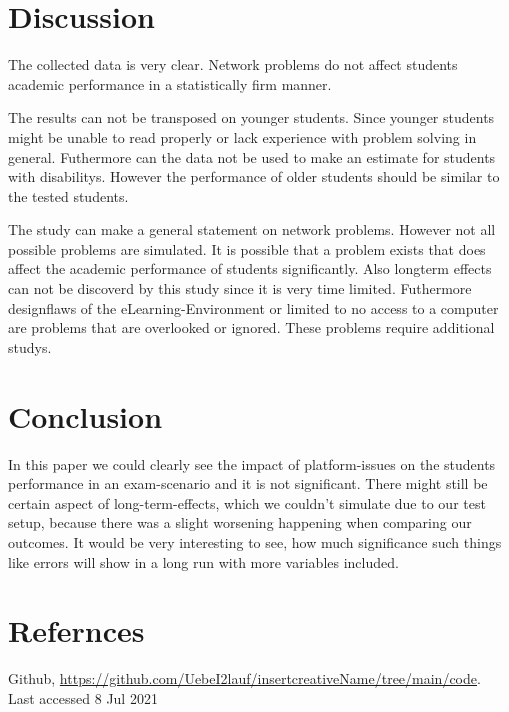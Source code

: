 \documentclass[runningheads]{llncs}
\begin{document}
\section{Discussion}
The collected data is very clear. Network problems do not affect students academic performance
in a statistically firm manner.

The results can not be transposed on younger students.
Since younger students might be unable to read properly or lack experience with problem solving
in general. Futhermore can the data not be used to make an estimate for students with disabilitys.
However the performance of older students should be similar to the tested students.

The study can make a general statement on network problems. However not all possible
problems are simulated. It is possible that a problem exists that does affect the academic performance of
students significantly. Also longterm effects can not be discoverd by this study since it is very time limited.
Futhermore designflaws of the eLearning-Environment or limited to no access to a computer are problems that
are overlooked or ignored. These problems require additional studys.
\section{Conclusion}
In this paper we could clearly see the impact of platform-issues on the students performance in an 
exam-scenario and it is not significant. There might still be certain aspect of long-term-effects,
which we couldn't simulate due to our test setup, because there was a slight worsening happening 
when comparing our outcomes. It would be very interesting to see, how much significance such things 
like errors will show  in a long run with more variables included.
\section{Refernces}
\begin{thebibliography}{8}
    Github, \url{https://github.com/UebeI2lauf/insertcreativeName/tree/main/code}. Last accessed 8 Jul 2021
    \end{thebibliography}
\end{document}
